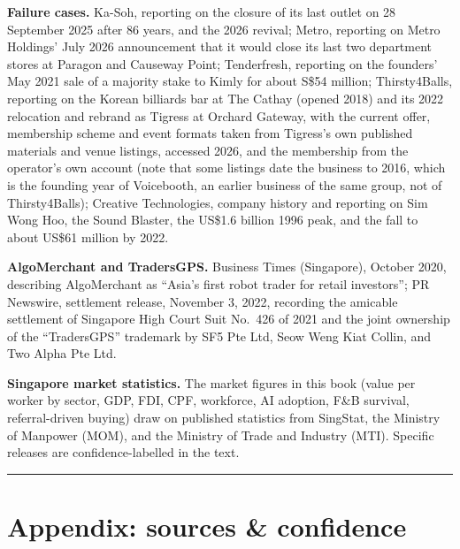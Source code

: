 \documentclass[10pt,twoside,openany]{memoir}
\begin{document}
{{{{{\textbf{Failure cases.} Ka-Soh, reporting on the closure of its last
outlet on 28 September 2025 after 86 years, and the 2026 revival; Metro,
reporting on Metro Holdings' July 2026 announcement that it would close
its last two department stores at Paragon and Causeway Point;
Tenderfresh, reporting on the founders' May 2021 sale of a majority
stake to Kimly for about S\$54 million; Thirsty4Balls, reporting on the
Korean billiards bar at The Cathay (opened 2018) and its 2022 relocation
and rebrand as Tigress at Orchard Gateway, with the current offer,
membership scheme and event formats taken from Tigress's own published
materials and venue listings, accessed 2026, and the membership from the
operator's own account (note that some listings date the business to
2016, which is the founding year of Voicebooth, an earlier business of
the same group, not of Thirsty4Balls); Creative Technologies, company
history and reporting on Sim Wong Hoo, the Sound Blaster, the US\$1.6
billion 1996 peak, and the fall to about US\$61 million by 2022.

\textbf{AlgoMerchant and TradersGPS.} Business Times (Singapore),
October 2020, describing AlgoMerchant as ``Asia's first robot trader for
retail investors''; PR Newswire, settlement release, November 3, 2022,
recording the amicable settlement of Singapore High Court Suit No.~426
of 2021 and the joint ownership of the ``TradersGPS'' trademark by SF5
Pte Ltd, Seow Weng Kiat Collin, and Two Alpha Pte Ltd.

\textbf{Singapore market statistics.} The market figures in this book
(value per worker by sector, GDP, FDI, CPF, workforce, AI adoption, F\&B
survival, referral-driven buying) draw on published statistics from
SingStat, the Ministry of Manpower (MOM), and the Ministry of Trade and
Industry (MTI). Specific releases are confidence-labelled in the text.

\begin{center}\rule{0.5\linewidth}{0.5pt}\end{center}

\FloatBarrier
\chapter{Appendix: sources \&
confidence}\label{appendix-sources-confidence}

}}}}}
\end{document}
